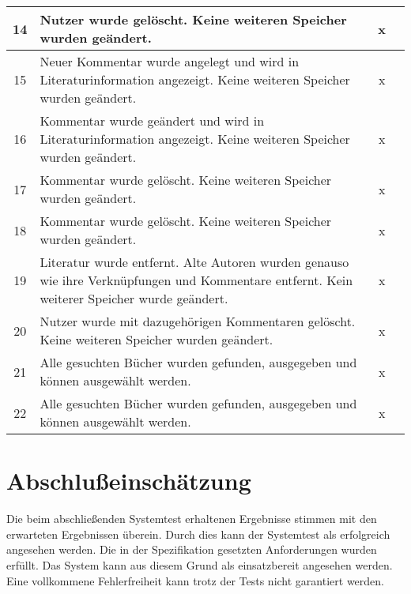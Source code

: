 \begin{longtable}{|c|p{8cm}|c|c|}
14 & Nutzer wurde gelöscht. Keine weiteren Speicher wurden geändert. & x &  \\\hline
15 & Neuer Kommentar wurde angelegt und wird in Literaturinformation angezeigt. Keine weiteren Speicher wurden geändert. & x &  \\\hline
16 & Kommentar wurde geändert und wird in Literaturinformation angezeigt. Keine weiteren Speicher wurden geändert. & x &  \\\hline
17 & Kommentar wurde gelöscht. Keine weiteren Speicher wurden geändert. & x &  \\\hline
18 & Kommentar wurde gelöscht. Keine weiteren Speicher wurden geändert. & x &  \\\hline
19 & Literatur wurde entfernt. Alte Autoren wurden genauso wie ihre Verknüpfungen und Kommentare entfernt. Kein weiterer Speicher wurde geändert. & x &  \\\hline
20 & Nutzer wurde mit dazugehörigen Kommentaren gelöscht. Keine weiteren Speicher wurden geändert. & x &  \\\hline
21 & Alle gesuchten Bücher wurden gefunden, ausgegeben und können ausgewählt werden. & x &  \\\hline
22 & Alle gesuchten Bücher wurden gefunden, ausgegeben und können ausgewählt werden. & x &  \\\hline
\end{longtable}

\section{Abschlußeinschätzung}
Die beim abschließenden Systemtest erhaltenen Ergebnisse stimmen mit den erwarteten Ergebnissen überein. Durch dies kann der Systemtest als erfolgreich angesehen werden. Die in der Spezifikation gesetzten Anforderungen wurden erfüllt. Das System kann aus diesem Grund als einsatzbereit angesehen werden. Eine vollkommene Fehlerfreiheit kann trotz der Tests nicht garantiert werden.
